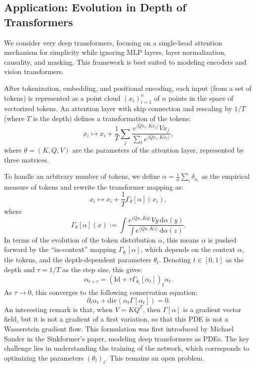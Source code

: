 \subsection{Application: Evolution in Depth of Transformers}

We consider very deep transformers, focusing on a single-head attention mechanism for simplicity while ignoring MLP layers, layer normalization, causality, and masking. This framework is best suited to modeling encoders and vision transformers. 

After tokenization, embedding, and positional encoding, each input (from a set of tokens) is represented as a point cloud $(x_i)_{i=1}^n$ of $n$ points in the space of vectorized tokens. An attention layer with skip connection and rescaling by $1/T$ (where $T$ is the depth) defines a transformation of the tokens:
\begin{equation*}
    x_i \mapsto x_i + \frac{1}{T} \sum_j \frac{e^{\langle Q x_i, K x_j \rangle} V x_j}{\sum_{\ell} e^{\langle Q x_i, K x_\ell \rangle}},
\end{equation*}
where $\theta = (K, Q, V)$ are the parameters of the attention layer, represented by three matrices.

To handle an arbitrary number of tokens, we define $\alpha = \frac{1}{n} \sum_i \delta_{x_i}$ as the empirical measure of tokens and rewrite the transformer mapping as:
\begin{equation*}
    x_i \mapsto x_i + \frac{1}{T} \Gamma_\theta[\alpha](x_i),
\end{equation*}
where
\begin{equation*}
    \Gamma_\theta[\alpha](x) := \int \frac{e^{\langle Q x, K y \rangle} V y \, \mathrm{d} \alpha(y)}{\int e^{\langle Q x, K z \rangle} \, \mathrm{d} \alpha(z)}.
\end{equation*}
In terms of the evolution of the token distribution $\alpha$, this means $\alpha$ is pushed forward by the ``in-context'' mapping $\Gamma_{\theta_t}[\alpha]$, which depends on the context $\alpha$, the tokens, and the depth-dependent parameters $\theta_t$. Denoting $t \in [0, 1]$ as the depth and $\tau = 1/T$ as the step size, this gives:
\begin{equation*}
    \alpha_{t+\tau} = (\mathrm{Id} + \tau \Gamma_{\theta_t}[\alpha_t])_\sharp \alpha_t.
\end{equation*}
As $\tau \to 0$, this converges to the following conservation equation:
\begin{equation*}
    \partial_t \alpha_t + \mathrm{div}(\alpha_t \Gamma[\alpha_t]) = 0.
\end{equation*}
An interesting remark is that, when $V=KQ^T$, then $\Gamma[\alpha]$ is a gradient vector field, but it is not a gradient of a first variation, so that this PDE is not a Wasserstein gradient flow. 
%
This formulation was first introduced by Michael Sander in the Sinkformer's paper, modeling deep transformers as PDEs. The key challenge lies in understanding the training of the network, which corresponds to optimizing the parameters $(\theta_t)_t$. This remains an open problem.



